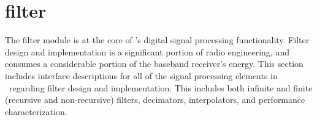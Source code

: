 % 
%

\newpage
\section{filter}
\label{module:filter}
The filter module is at the core of \liquid's digital signal processing
functionality.
Filter design and implementation is a significant portion of radio
engineering, and consumes a considerable portion of the baseband receiver's
energy.
%
This section includes interface descriptions for all of the signal
processing elements in \liquid\ regarding filter design and
implementation.
This includes both infinite and finite (recursive and non-recursive)
filters, decimators, interpolators, and performance characterization.


% 
%
